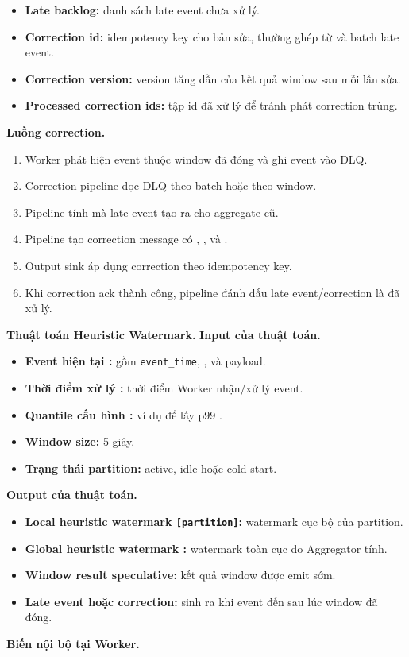 \documentclass[12pt,a4paper]{article}
\begin{document}
\begin{itemize}
\item \textbf{Late backlog:} danh sách late event chưa xử lý.
\item \textbf{Correction id:} idempotency key cho bản sửa, thường ghép từ  và batch late event.
\item \textbf{Correction version:} version tăng dần của kết quả window sau mỗi lần sửa.
\item \textbf{Processed correction ids:} tập id đã xử lý để tránh phát correction trùng.
\end{itemize}
\textbf{Luồng correction.}

\begin{enumerate}
\item Worker phát hiện event thuộc window đã đóng và ghi event vào DLQ.
\item Correction pipeline đọc DLQ theo batch hoặc theo window.
\item Pipeline tính  mà late event tạo ra cho aggregate cũ.
\item Pipeline tạo correction message có , ,  và .
\item Output sink áp dụng correction theo idempotency key.
\item Khi correction ack thành công, pipeline đánh dấu late event/correction là đã xử lý.
\end{enumerate}
\textbf{Thuật toán Heuristic Watermark.}
\textbf{Input của thuật toán.}

\begin{itemize}
\item \textbf{Event hiện tại :} gồm \texttt{event\_time}, ,  và payload.
\item \textbf{Thời điểm xử lý :} thời điểm Worker nhận/xử lý event.
\item \textbf{Quantile cấu hình :} ví dụ  để lấy p99 .
\item \textbf{Window size:} 5 giây.
\item \textbf{Trạng thái partition:} active, idle hoặc cold-start.
\end{itemize}
\textbf{Output của thuật toán.}

\begin{itemize}
\item \textbf{Local heuristic watermark \texttt{[partition]}:} watermark cục bộ của partition.
\item \textbf{Global heuristic watermark :} watermark toàn cục do Aggregator tính.
\item \textbf{Window result speculative:} kết quả window được emit sớm.
\item \textbf{Late event hoặc correction:} sinh ra khi event đến sau lúc window đã đóng.
\end{itemize}
\textbf{Biến nội bộ tại Worker.}
\end{document}
